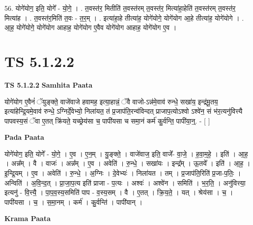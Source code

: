 \documentclass[17pt]{extarticle}
\begin{document}
56. योगे॑योग॒ इति॒ योगे᳚ - यो॒गे॒ । . त॒वस्त॑र॒ मितीति॑ त॒वस्त॑रम् त॒वस्त॑र॒ मित्या॑हा॒हेति॑ त॒वस्त॑रम् त॒वस्त॑र॒ मित्या॑ह । . त॒वस्त॑र॒मिति॑ त॒वः - त॒र॒म् । . इत्या॑हा॒हे तीत्या॑ह॒ योगे॑योगे॒ योगे॑योग आ॒हे तीत्या॑ह॒ योगे॑योगे । . आ॒ह॒ योगे॑योगे॒ योगे॑योग आहाह॒ योगे॑योग ए॒वैव योगे॑योग आहाह॒ योगे॑योग ए॒व । \newline
\pagebreak
{}

\section{ TS 5.1.2.2 }

\textbf{TS 5.1.2.2 } \newline
\textbf{Samhita Paata} \newline

योगे॑योग ए॒वैनं॑ ॅयुङ्क्ते॒ वाजे॑वाजे हवामह॒ इत्या॒हान्नं॒ ॅवै वाजो-ऽन्न॑मे॒वाव॑ रुन्धे॒ सखा॑य॒ इन्द्र॑मू॒तय॒ इत्या॑हेन्द्रि॒यमे॒वाव॑ रुन्धे॒ ऽग्निर्दे॒वेभ्यो॒ निला॑यत॒ तं प्र॒जाप॑ति॒रन्व॑विन्दत् प्राजाप॒त्योऽश्वो ऽश्वे॑न॒ सं भ॑र॒त्यनु॑वित्त्यै पापवस्य॒सं ॅवा ए॒तत् क्रि॑यते॒ यच्छ्रेय॑सा च॒ पापी॑यसा च समा॒नं कर्म॑ कु॒र्वन्ति॒ पापी॑या॒न्॒. - [  ] \newline

\textbf{Pada Paata} \newline

योगे॑योग॒ इति॒ योगे᳚ - यो॒गे॒ । ए॒व । ए॒न॒म् । यु॒ङ्क्ते॒ । वाजे॑वाज॒ इति॒ वाजे᳚- वा॒जे॒ । ह॒वा॒म॒हे॒ । इति॑ । आ॒ह॒ । अन्न᳚म् । वै । वाजः॑ । अन्न᳚म् । ए॒व । अवेति॑ । रु॒न्धे॒ । सखा॑यः । इन्द्र᳚म् । ऊ॒तये᳚ । इति॑ । आ॒ह॒ । इ॒न्द्रि॒यम् । ए॒व । अवेति॑ । रु॒न्धे॒ । अ॒ग्निः । दे॒वेभ्यः॑ । निला॑यत । तम् । प्र॒जाप॑ति॒रिति॑ प्र॒जा-प॒तिः॒ । अन्विति॑ । अ॒वि॒न्द॒त् । प्रा॒जा॒प॒त्य इति॑ प्राजा - प॒त्यः । अश्वः॑ । अश्वे॑न । समिति॑ । भ॒र॒ति॒ । अनु॑वित्त्या॒ इत्यनु॑ - वि॒त्त्यै॒ । पा॒प॒व॒स्य॒समिति॑ पाप - व॒स्य॒सम् । वै । ए॒तत् । क्रि॒य॒ते॒ । यत् । श्रेय॑सा । च॒ । पापी॑यसा । च॒ । स॒मा॒नम् । कर्म॑ । कु॒र्वन्ति॑ । पापी॑यान् ।  \newline


\textbf{Krama Paata} \newline
\end{document}

